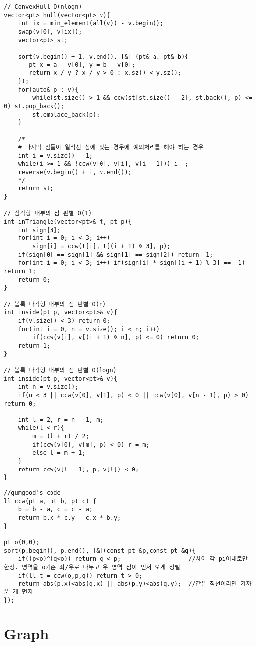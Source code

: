 \documentclass[landscape, 8pt, a4paper, oneside, twocolumn]{extarticle}
\begin{document}
\begin{verbatim}
// ConvexHull O(nlogn)
vector<pt> hull(vector<pt> v){
    int ix = min_element(all(v)) - v.begin();
    swap(v[0], v[ix]);
    vector<pt> st;
    
    sort(v.begin() + 1, v.end(), [&] (pt& a, pt& b){
       pt x = a - v[0], y = b - v[0];
       return x / y ? x / y > 0 : x.sz() < y.sz();
    });
    for(auto& p : v){
        while(st.size() > 1 && ccw(st[st.size() - 2], st.back(), p) <= 0) st.pop_back();
        st.emplace_back(p);
    }
    
    /*
    # 마지막 점들이 일직선 상에 있는 경우에 예외처리를 해야 하는 경우
    int i = v.size() - 1;
    while(i >= 1 && !ccw(v[0], v[i], v[i - 1])) i--;
    reverse(v.begin() + i, v.end());
    */
    return st;
}

// 삼각형 내부의 점 판별 O(1)
int inTriangle(vector<pt>& t, pt p){
    int sign[3];
    for(int i = 0; i < 3; i++)
        sign[i] = ccw(t[i], t[(i + 1) % 3], p);
    if(sign[0] == sign[1] && sign[1] == sign[2]) return -1;
    for(int i = 0; i < 3; i++) if(sign[i] * sign[(i + 1) % 3] == -1) return 1;
    return 0;
}

// 볼록 다각형 내부의 점 판별 O(n)
int inside(pt p, vector<pt>& v){
    if(v.size() < 3) return 0;
    for(int i = 0, n = v.size(); i < n; i++)
        if(ccw(v[i], v[(i + 1) % n], p) <= 0) return 0;
    return 1;
}

// 볼록 다각형 내부의 점 판별 O(logn)
int inside(pt p, vector<pt>& v){
    int n = v.size();
    if(n < 3 || ccw(v[0], v[1], p) < 0 || ccw(v[0], v[n - 1], p) > 0) return 0;
    
    int l = 2, r = n - 1, m;
    while(l < r){
        m = (l + r) / 2;
        if(ccw(v[0], v[m], p) < 0) r = m;
        else l = m + 1;
    }
    return ccw(v[l - 1], p, v[l]) < 0;
}
\end{verbatim}
\newpage
\begin{verbatim}
//gumgood's code
ll ccw(pt a, pt b, pt c) {
    b = b - a, c = c - a;
    return b.x * c.y - c.x * b.y;
}

pt o(0,0);
sort(p.begin(), p.end(), [&](const pt &p,const pt &q){
    if((p<o)^(q<o)) return q < p;                   //사이 각 pi이내로만 한정. 영역을 o기준 좌/우로 나누고 우 영역 점이 먼저 오게 정렬
    if(ll t = ccw(o,p,q)) return t > 0;          
    return abs(p.x)<abs(q.x) || abs(p.y)<abs(q.y);  //같은 직선이라면 가까운 게 먼저
});
\end{verbatim}
\section{Graph}
\end{document}
